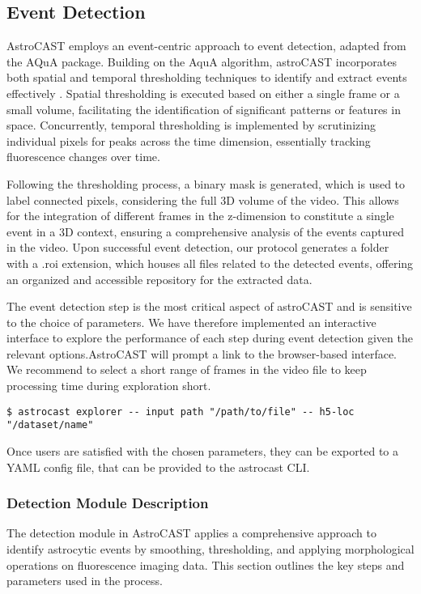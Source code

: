 \subsection{Event Detection}

AstroCAST employs an event-centric approach to event detection, adapted from the AQuA package\citep{wang_event-based_2018}. Building on the AquA algorithm, astroCAST incorporates both spatial and temporal thresholding techniques to identify and extract events effectively . Spatial thresholding is executed based on either a single frame or a small volume, facilitating the identification of significant patterns or features in space. Concurrently, temporal thresholding is implemented by scrutinizing individual pixels for peaks across the time dimension, essentially tracking fluorescence changes over time.

Following the thresholding process, a binary mask is generated, which is used to label connected pixels, considering the full 3D volume of the video. This allows for the integration of different frames in the z-dimension to constitute a single event in a 3D context, ensuring a comprehensive analysis of the events captured in the video. Upon successful event detection, our protocol generates a folder with a .roi extension, which houses all files related to the detected events, offering an organized and accessible repository for the extracted data.

The event detection step is the most critical aspect of astroCAST and is sensitive to the choice of parameters. We have therefore implemented an interactive interface to explore the performance of each step during event detection given the relevant options.AstroCAST will prompt a link to the browser-based interface. We recommend to select a short range of frames in the video file to keep processing time during exploration short.

\begin{lstlisting}[style=bashStyle]
    $ astrocast explorer -- input path "/path/to/file" -- h5-loc "/dataset/name"
\end{lstlisting}

Once users are satisfied with the chosen parameters, they can be exported to a YAML config file, that can be provided
to the astrocast \ac{CLI}.

\subsubsection{Detection Module Description}
The detection module in AstroCAST applies a comprehensive approach to identify astrocytic events by smoothing,
thresholding, and applying morphological operations on fluorescence imaging data. This section outlines the key steps
and parameters used in the process.

